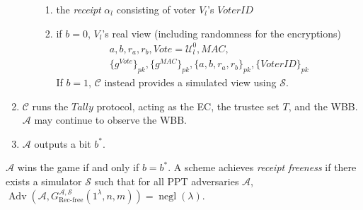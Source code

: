 \documentclass[12pt,a4paper]{article}
\DeclareMathOperator{\negl}{\text{negl}}
\DeclareMathOperator{\Adv}{\text{Adv}}
\theoremstyle{definition}
\newcommand{\Vote}{\mathit{Vote}}
\newcommand{\VoterID}{\mathit{VoterID}}
\newcommand{\Mac}{\mathit{MAC}}
\begin{document}
\begin{definition}
\begin{enumerate}
\begin{itemize}
            \begin{enumerate}
                \item the \textit{receipt} $\alpha_l$ consisting of voter $V_l$'s $\VoterID$
                \item if $b=0$, $V_l$'s real view (including randomness for the encryptions)
                \begin{gather*}
                    a, b, r_a, r_b, \Vote=\mathcal{U}^0_l, \Mac,\\\{g^\Vote\}_{pk}, \{g^\Mac\}_{pk}, \{a,b,r_a,r_b\}_{pk},\{\VoterID\}_{pk}
                \end{gather*}
                If $b=1$, $\mathcal{C}$ instead provides a simulated view using $\mathcal{S}$.
            \end{enumerate}
        \end{itemize}
        \item $\mathcal{C}$ runs the $\mathit{Tally}$ protocol, acting as the EC, the trustee set $T$, and the WBB. $\mathcal{A}$ may continue to observe the WBB.
        \item $\mathcal{A}$ outputs a bit $b^*$.
    \end{enumerate}
    $\mathcal{A}$ wins the game if and only if $b=b^*$. A scheme achieves \textit{receipt freeness} if there exists a simulator $\mathcal{S}$ such that for all PPT adversaries $\mathcal{A}$, $\Adv\left(\mathcal{A}, G^{\mathcal{A},\mathcal{S}}_{\text{Rec-free}}(1^\lambda, n, m)\right)=\negl(\lambda)$.
\end{definition}
\end{document}
